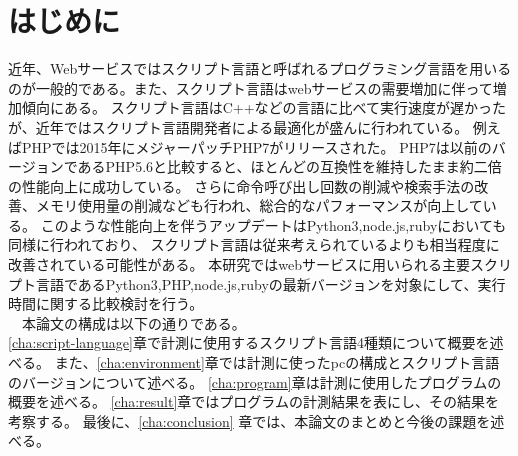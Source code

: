 \chapter{はじめに}
\label{cha:intro}
近年、Webサービスではスクリプト言語と呼ばれるプログラミング言語を用いるのが一般的である。また、スクリプト言語はwebサービスの需要増加に伴って増加傾向にある。
スクリプト言語はC++などの言語に比べて実行速度が遅かったが、近年ではスクリプト言語開発者による最適化が盛んに行われている。
例えばPHPでは2015年にメジャーパッチPHP7\cite{PHPchange}がリリースされた。
PHP7は以前のバージョンであるPHP5.6と比較すると、ほとんどの互換性を維持したまま約二倍の性能向上に成功している。
さらに命令呼び出し回数の削減や検索手法の改善、メモリ使用量の削減なども行われ、総合的なパフォーマンスが向上している。
このような性能向上を伴うアップデートはPython3,node.js,rubyにおいても同様に行われており、
スクリプト言語は従来考えられているよりも相当程度に改善されている可能性がある。
本研究ではwebサービスに用いられる主要スクリプト言語であるPython3,PHP,node.js,rubyの最新バージョンを対象にして、実行時間に関する比較検討を行う。\\

　本論文の構成は以下の通りである。\\
\ref{cha:script-language}章で計測に使用するスクリプト言語4種類について概要を述べる。
また、\ref{cha:environment}章では計測に使ったpcの構成とスクリプト言語のバージョンについて述べる。
\ref{cha:program}章は計測に使用したプログラムの概要を述べる。
\ref{cha:result}章ではプログラムの計測結果を表にし、その結果を考察する。
最後に、\ref{cha:conclusion} 章では、本論文のまとめと今後の課題を述べる。